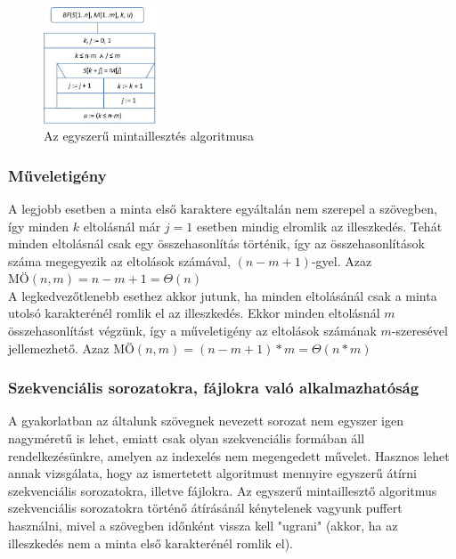 \documentclass[margin=0px]{article}
\begin{document}
	\begin{figure}[H]
				\centering
				\includegraphics[width=0.3\textwidth]{img/bruteforce.png}
				\caption{Az egyszerű mintaillesztés algoritmusa}
				\label{fig:bruteforce}
			\end{figure}

    \subsubsection*{Műveletigény}

    \noindent A legjobb esetben a minta első karaktere egyáltalán nem szerepel a szövegben, így minden $k$ eltolásnál már $j=1$ esetben mindig elromlik az illeszkedés. Tehát minden eltolásnál csak egy összehasonlítás történik, így az összehasonlítások száma megegyezik az eltolások számával, $(n-m+1)$-gyel. Azaz $\text{MÖ}(n, m) = n - m + 1 = \Theta(n)$\\

    \noindent A legkedvezőtlenebb esethez akkor jutunk, ha minden eltolásánál csak a minta utolsó karakterénél romlik el az illeszkedés. Ekkor minden eltolásnál $m$ összehasonlítást végzünk, így a műveletigény az eltolások számának $m$-szeresével jellemezhető. Azaz $\text{MÖ}(n, m) = (n - m + 1) * m = \Theta(n * m)$

    \subsubsection*{Szekvenciális sorozatokra, fájlokra való alkalmazhatóság}

    \noindent A gyakorlatban az általunk szövegnek nevezett sorozat nem egyszer igen nagyméretű is lehet, emiatt csak olyan szekvenciális formában áll rendelkezésünkre, amelyen az indexelés nem megengedett művelet. Hasznos lehet annak vizsgálata, hogy az ismertetett algoritmust mennyire egyszerű átírni szekvenciális sorozatokra, illetve fájlokra. Az egyszerű mintaillesztő algoritmus szekvenciális sorozatokra történő átírásánál kénytelenek vagyunk puffert használni, mivel a szövegben időnként vissza kell "ugrani" (akkor, ha az illeszkedés nem a minta első karakterénél romlik el).
\end{document}
